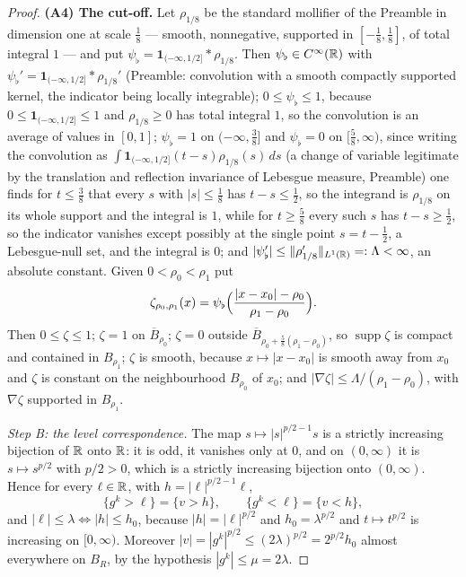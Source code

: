 \begin{proof}
\textbf{(A4) The cut-off.}  Let $\rho_{1/8}$ be the standard mollifier of the
Preamble in dimension one at scale $\tfrac18$ --- smooth, nonnegative, supported
in $[-\tfrac18,\tfrac18]$, of total integral $1$ --- and put
$\psi_\flat=\mathbf1_{(-\infty,1/2]}*\rho_{1/8}$.  Then
$\psi_\flat\in C^\infty(\mathbb{R})$ with
$\psi_\flat'=\mathbf1_{(-\infty,1/2]}*\rho_{1/8}'$ (Preamble: convolution with a
smooth compactly supported kernel, the indicator being locally integrable);
$0\le\psi_\flat\le1$, because $0\le\mathbf1_{(-\infty,1/2]}\le1$ and
$\rho_{1/8}\ge0$ has total integral $1$, so the convolution is an average of
values in $[0,1]$; $\psi_\flat=1$ on $(-\infty,\tfrac38]$ and $\psi_\flat=0$ on
$[\tfrac58,\infty)$, since writing the convolution as
$\int\mathbf1_{(-\infty,1/2]}(t-s)\rho_{1/8}(s)\,ds$ (a change of variable
legitimate by the translation and reflection invariance of Lebesgue measure,
Preamble) one finds for $t\le\tfrac38$ that every $s$ with $|s|\le\tfrac18$ has
$t-s\le\tfrac12$, so the integrand is $\rho_{1/8}$ on its whole support and the
integral is $1$, while for $t\ge\tfrac58$ every such $s$ has $t-s\ge\tfrac12$,
so the indicator vanishes except possibly at the single point $s=t-\tfrac12$, a
Lebesgue-null set, and the integral is $0$; and
$|\psi_\flat'|\le\|\rho_{1/8}'\|_{L^1(\mathbb{R})}=:\Lambda<\infty$, an absolute
constant.  Given $0<\rho_0<\rho_1$ put
\[
\zeta_{\rho_0,\rho_1}(x)=\psi_\flat
\Bigl(\frac{|x-x_0|-\rho_0}{\rho_1-\rho_0}\Bigr).
\]
Then $0\le\zeta\le1$; $\zeta=1$ on $\overline B_{\rho_0}$; $\zeta=0$ outside
$\overline B_{\rho_0+\frac58(\rho_1-\rho_0)}$, so $\operatorname{supp}\zeta$ is
compact and contained in $B_{\rho_1}$; $\zeta$ is smooth, because
$x\mapsto|x-x_0|$ is smooth away from $x_0$ and $\zeta$ is constant on the
neighbourhood $B_{\rho_0}$ of $x_0$; and
$|\nabla\zeta|\le\Lambda/(\rho_1-\rho_0)$, with $\nabla\zeta$ supported in
$B_{\rho_1}$.

\emph{Step B: the level correspondence.}  The map
$s\mapsto|s|^{p/2-1}s$ is a strictly increasing bijection of $\mathbb{R}$ onto $\mathbb{R}$: it
is odd, it vanishes only at $0$, and on $(0,\infty)$ it is $s\mapsto s^{p/2}$
with $p/2>0$, which is a strictly increasing bijection onto $(0,\infty)$.  Hence
for every $\ell\in\mathbb{R}$, with
$h=|\ell|^{p/2-1}\ell$,
\[
\{g^k>\ell\}=\{v>h\},\qquad \{g^k<\ell\}=\{v<h\},
\tag{B.1}
\]
and $|\ell|\le\lambda\iff|h|\le h_0$, because $|h|=|\ell|^{p/2}$ and
$h_0=\lambda^{p/2}$ and $t\mapsto t^{p/2}$ is increasing on $[0,\infty)$.
Moreover $|v|=|g^k|^{p/2}\le(2\lambda)^{p/2}=2^{p/2}h_0$ almost everywhere on
$B_R$, by the hypothesis $|g^k|\le\mu=2\lambda$.


\end{proof}
